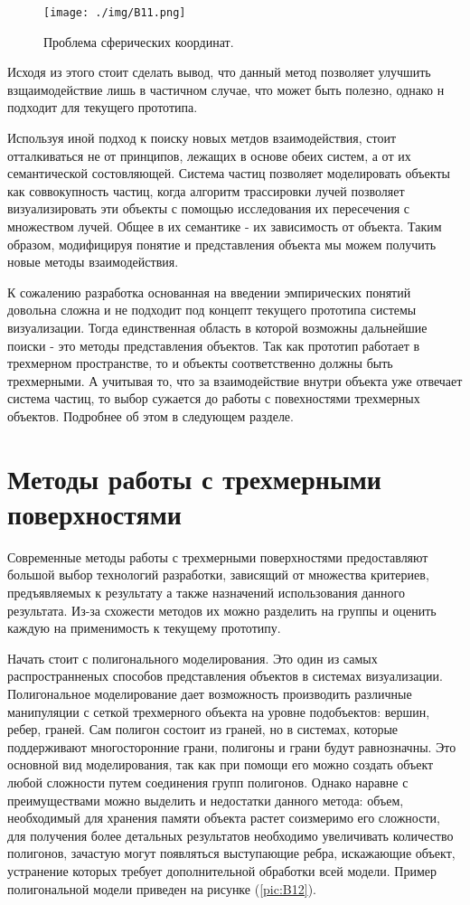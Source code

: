 \begin{figure} 
\begin{center}
\texttt{[image: ./img/B11.png]}
\end{center}
\caption{Проблема сферических координат.}
\label{pic:B11}
\end{figure}

Исходя из этого стоит сделать вывод, что данный метод позволяет улучшить взщаимодействие лишь в частичном случае, что может быть полезно, однако н подходит для текущего прототипа.

Используя иной подход к поиску новых метдов взаимодействия, стоит отталкиваться не от принципов, лежащих в основе обеих систем, а от их семантической состовляющей. Система частиц позволяет моделировать объекты как соввокупность частиц, когда алгоритм трассировки лучей позволяет визуализировать эти объекты с помощью исследования их пересечения с множеством лучей. Общее в их семантике  - их зависимость от объекта. Таким образом, модифицируя понятие и представления объекта мы можем получить новые методы взаимодействия. 

К сожалению разработка основанная на введении эмпирических понятий довольна сложна и не подходит под концепт текущего прототипа системы визуализации. Тогда единственная область в которой возможны дальнейшие поиски - это методы представления объектов. Так как прототип работает в трехмерном пространстве, то и объекты соответственно должны быть трехмерными. А учитывая то, что за взаимодействие внутри объекта уже отвечает система частиц, то выбор сужается до работы с повехностями трехмерных объектов. Подробнее об этом в следующем разделе.

\section{Методы работы с трехмерными поверхностями}

Современные методы работы с трехмерными поверхностями предоставляют большой выбор технологий разработки, зависящий от множества критериев, предъявляемых к результату а также назначений использования данного результата. Из-за схожести методов их можно разделить на группы и оценить каждую на применимость к текущему прототипу.

Начать стоит с полигонального моделирования. Это один из самых распространненых способов представления объектов в системах визуализации. Полигональное моделирование дает возможность производить различные манипуляции с сеткой трехмерного объекта на уровне подобъектов: вершин, ребер, граней. Сам полигон состоит из граней, но в системах, которые поддерживают многосторонние грани, полигоны и грани будут равнозначны.  Это основной вид моделирования, так как при помощи его можно создать объект любой сложности путем соединения групп полигонов. Однако наравне с преимуществами можно выделить и недостатки данного метода: объем, необходимый для хранения памяти объекта растет соизмеримо его сложности, для получения более детальных результатов необходимо увеличивать количество полигонов, зачастую могут появляться выступающие ребра, искажающие объект, устранение которых требует дополнительной обработки всей модели. Пример полигональной модели приведен на рисунке  (\ref{pic:B12}).


